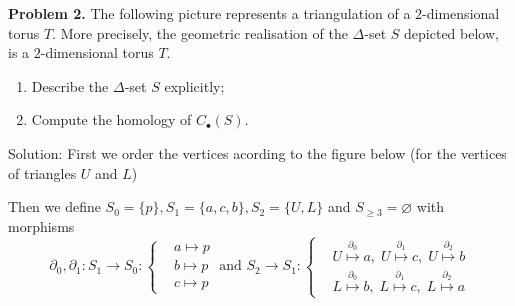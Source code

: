 \begin{dang}
\textbf{Problem 2.} The following picture represents a triangulation of a \(2\)-dimensional torus \(T\). More precisely, the geometric realisation of the \(\Delta\)-set \(S\) depicted below, is a \(2\)-dimensional torus \(T\).
    
    \begin{center}
    \end{center}
    
    \begin{enumerate}
        \item[(a)] Describe the \(\Delta\)-set \(S\) explicitly;
        \item[(b)] Compute the homology of \(C_{\bullet}(S)\).
    \end{enumerate}
\end{dang}
Solution: 
First we order the vertices acording to the figure below (for the vertices of triangles $U$ and $L$)
\begin{center}
\end{center}
Then we define 
$S_0=\{p\}, S_1=\{a,c,b\},S_2=\{U,L\}$ and $S_{\geq3}=\varnothing$ with morphisms 
\begin{equation}
   \partial_0,\partial_1: S_1\to S_0: \left\{\begin{aligned}
        &a\mapsto p\\ &b\mapsto p\\ &c\mapsto p
    \end{aligned}\right.\;\text{and }
    S_2\to S_1:\left\{\begin{aligned}
     &U\overset{\partial_0}{\mapsto}a,\; U\overset{\partial_1}{\mapsto}c,\;U\overset{\partial_2}{\mapsto}b\\
     &L\overset{\partial_0}{\mapsto}b,\; L\overset{\partial_1}{\mapsto}c,\;L\overset{\partial_2}{\mapsto}a   
    \end{aligned}\right.
\end{equation}

